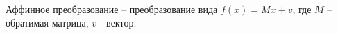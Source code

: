 Аффинное преобразование – преобразование вида \(f(x) = Mx + v\), где \(M\) – обратимая матрица, \(v\) - вектор.

\newpage





%
